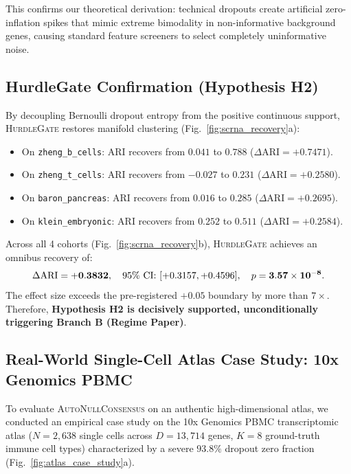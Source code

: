 \documentclass[preprint,12pt]{elsarticle}
\begin{document}
This confirms our theoretical derivation: technical dropouts create artificial zero-inflation spikes that mimic extreme bimodality in non-informative background genes, causing standard feature screeners to select completely uninformative noise.

\subsection{HurdleGate Confirmation (Hypothesis H2)}
By decoupling Bernoulli dropout entropy from the positive continuous support, \textsc{HurdleGate} restores manifold clustering (Fig.~\ref{fig:scrna_recovery}a):
\begin{itemize}
    \item On \texttt{zheng\_b\_cells}: $\text{ARI}$ recovers from $0.041$ to $\mathbf{0.788}$ ($\Delta\text{ARI} = \mathbf{+0.7471}$).
    \item On \texttt{zheng\_t\_cells}: $\text{ARI}$ recovers from $-0.027$ to $\mathbf{0.231}$ ($\Delta\text{ARI} = \mathbf{+0.2580}$).
    \item On \texttt{baron\_pancreas}: $\text{ARI}$ recovers from $0.016$ to $\mathbf{0.285}$ ($\Delta\text{ARI} = \mathbf{+0.2695}$).
    \item On \texttt{klein\_embryonic}: $\text{ARI}$ recovers from $0.252$ to $\mathbf{0.511}$ ($\Delta\text{ARI} = \mathbf{+0.2584}$).
\end{itemize}

Across all 4 cohorts (Fig.~\ref{fig:scrna_recovery}b), \textsc{HurdleGate} achieves an omnibus recovery of:
\begin{equation}
    \Delta\text{ARI} = \mathbf{+0.3832}, \quad 95\% \text{ CI: } [+0.3157, +0.4596], \quad p = \mathbf{3.57 \times 10^{-8}}.
\end{equation}
The effect size exceeds the pre-registered $+0.05$ boundary by more than $7\times$. Therefore, \textbf{Hypothesis H2 is decisively supported, unconditionally triggering Branch B (Regime Paper)}.

\subsection{Real-World Single-Cell Atlas Case Study: 10x Genomics PBMC}
To evaluate \textsc{AutoNullConsensus} on an authentic high-dimensional atlas, we conducted an empirical case study on the 10x Genomics PBMC transcriptomic atlas ($N = 2{,}638$ single cells across $D = 13{,}714$ genes, $K = 8$ ground-truth immune cell types) characterized by a severe $93.8\%$ dropout zero fraction (Fig.~\ref{fig:atlas_case_study}a).
\end{document}
